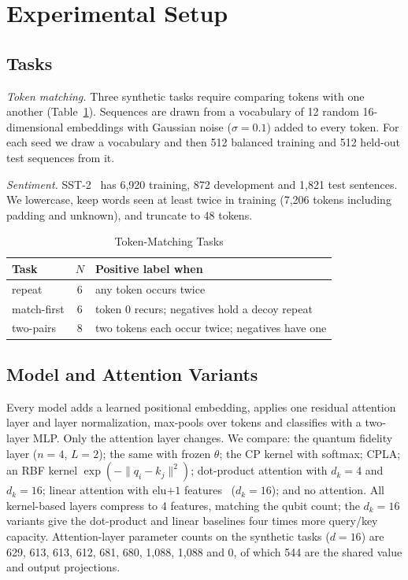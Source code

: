 \documentclass[conference]{IEEEtran}
\newcommand{\cpla}{CPLA}
\begin{document}
\section{Experimental Setup}

\subsection{Tasks}
\textit{Token matching.} Three synthetic tasks require comparing tokens with one another (Table~\ref{tab:tasks}). Sequences are drawn from a vocabulary of 12 random 16-dimensional embeddings with Gaussian noise ($\sigma=0.1$) added to every token. For each seed we draw a vocabulary and then 512 balanced training and 512 held-out test sequences from it.

\textit{Sentiment.} SST-2~\cite{socher2013sst} has 6{,}920 training, 872 development and 1{,}821 test sentences. We lowercase, keep words seen at least twice in training (7{,}206 tokens including padding and unknown), and truncate to 48 tokens.

\begin{table}[t]
\caption{Token-Matching Tasks}
\label{tab:tasks}
\centering
\setlength{\tabcolsep}{3pt}
\begin{tabular}{@{}lcl@{}}
\toprule
Task & $N$ & Positive label when \\
\midrule
repeat & 6 & any token occurs twice \\
match-first & 6 & token 0 recurs; negatives hold a decoy repeat \\
two-pairs & 8 & two tokens each occur twice; negatives have one \\
\bottomrule
\end{tabular}
\end{table}

\subsection{Model and Attention Variants}
Every model adds a learned positional embedding, applies one residual attention layer and layer normalization, max-pools over tokens and classifies with a two-layer MLP. Only the attention layer changes. We compare: the quantum fidelity layer ($n=4$, $L=2$); the same with frozen $\theta$; the CP kernel with softmax; \cpla; an RBF kernel $\exp(-\|q_i-k_j\|^2)$; dot-product attention with $d_k=4$ and $d_k=16$; linear attention with elu$+1$ features~\cite{katharopoulos2020linear} ($d_k=16$); and no attention. All kernel-based layers compress to 4 features, matching the qubit count; the $d_k=16$ variants give the dot-product and linear baselines four times more query/key capacity. Attention-layer parameter counts on the synthetic tasks ($d=16$) are 629, 613, 613, 612, 681, 680, 1{,}088, 1{,}088 and 0, of which 544 are the shared value and output projections.
\end{document}
